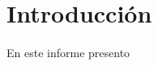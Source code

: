 \documentclass[../main.tex]{subfiles}
\begin{document}
\section{Introducción}

\paragraph{} En este informe presento %
\end{document}
